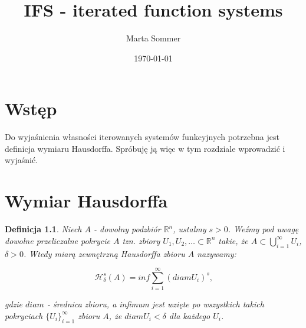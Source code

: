 \documentclass{mini}
\title{IFS - iterated function systems}
\author{Marta Sommer}
\date{\today}
\begin{document}
\maketitle
\tableofcontents

\newtheorem{tw}{Twierdzenie}[chapter]

\newenvironment{dow1}{\textbf{\textit{Dowód pierwszy}}}{\begin{flushright} $\blacksquare$ \end{flushright}} 

\newenvironment{dow2}{\textbf{\textit{Dowód drugi}}}{\begin{flushright} $\blacksquare$ \end{flushright}}

\newtheorem{df}{Definicja}[chapter]

\newenvironment{dow}{\textbf{\textit{Dowód}}}{\begin{flushright} $\blacksquare$ \end{flushright}}





\chapter*{Wstęp}


Do wyjaśnienia własności iterowanych systemów funkcyjnych potrzebna jest definicja wymiaru Hausdorffa. Spróbuję ją więc w tym rozdziale wprowadzić i wyjaśnić.



\chapter{Wymiar Hausdorffa}


\begin{df}

Niech $A$ - dowolny podzbiór $\mathbb{R}^n$, ustalmy $s>0$. Weźmy pod uwagę dowolne przeliczalne pokrycie $A$ tzn. zbiory $U_1,U_2,\ldots\subset\mathbb{R}^{n}$ takie, że $A\subset\bigcup_{i=1}^{\infty}{U_i}$, $\delta>0$.
Wtedy miarą zewnętrzną Hausdorffa zbioru $A$ nazywamy:

\begin{equation}\label{mzh}
\mathcal{H}^{s}_{\delta}{(A)} = inf \sum^{\infty}_{i=1}{(diam U_i)^{s}}\textrm{,}
\end{equation}

gdzie $diam$ - średnica zbioru, a infimum jest wzięte po wszystkich takich pokryciach $\lbrace U_i\rbrace^{\infty}_{i=1}$ zbioru $A$, że $ diam U_i < \delta$ dla każdego $U_i$.  

\end{df}
\end{document}
